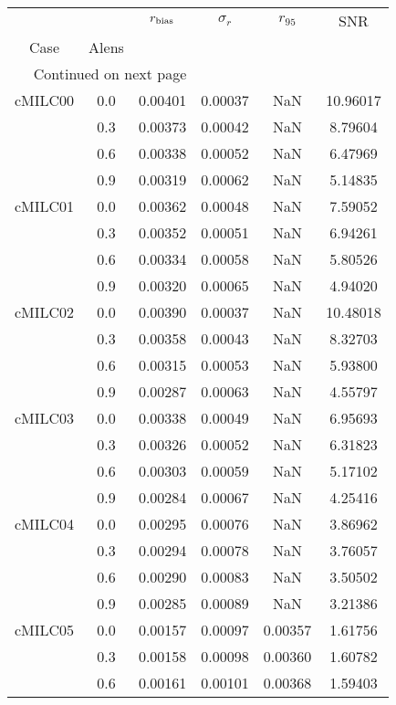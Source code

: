 \begin{longtable}{cccccc}
\toprule
        &     &  $r_{\rm bias}$  &  $\sigma_r$ &  $r_{95}$ &      SNR \\
Case & Alens &                  &             &           &          \\
\midrule
\endhead
\midrule
\multicolumn{3}{r}{{Continued on next page}} \\
\midrule
\endfoot

\bottomrule
\endlastfoot
cMILC00 & 0.0 & 0.00401 & 0.00037 & NaN & 10.96017 \\
        & 0.3 & 0.00373 & 0.00042 & NaN & 8.79604 \\
        & 0.6 & 0.00338 & 0.00052 & NaN & 6.47969 \\
        & 0.9 & 0.00319 & 0.00062 & NaN & 5.14835 \\
cMILC01 & 0.0 & 0.00362 & 0.00048 & NaN & 7.59052 \\
        & 0.3 & 0.00352 & 0.00051 & NaN & 6.94261 \\
        & 0.6 & 0.00334 & 0.00058 & NaN & 5.80526 \\
        & 0.9 & 0.00320 & 0.00065 & NaN & 4.94020 \\
cMILC02 & 0.0 & 0.00390 & 0.00037 & NaN & 10.48018 \\
        & 0.3 & 0.00358 & 0.00043 & NaN & 8.32703 \\
        & 0.6 & 0.00315 & 0.00053 & NaN & 5.93800 \\
        & 0.9 & 0.00287 & 0.00063 & NaN & 4.55797 \\
cMILC03 & 0.0 & 0.00338 & 0.00049 & NaN & 6.95693 \\
        & 0.3 & 0.00326 & 0.00052 & NaN & 6.31823 \\
        & 0.6 & 0.00303 & 0.00059 & NaN & 5.17102 \\
        & 0.9 & 0.00284 & 0.00067 & NaN & 4.25416 \\
cMILC04 & 0.0 & 0.00295 & 0.00076 & NaN & 3.86962 \\
        & 0.3 & 0.00294 & 0.00078 & NaN & 3.76057 \\
        & 0.6 & 0.00290 & 0.00083 & NaN & 3.50502 \\
        & 0.9 & 0.00285 & 0.00089 & NaN & 3.21386 \\
cMILC05 & 0.0 & 0.00157 & 0.00097 & 0.00357 & 1.61756 \\
        & 0.3 & 0.00158 & 0.00098 & 0.00360 & 1.60782 \\
        & 0.6 & 0.00161 & 0.00101 & 0.00368 & 1.59403 \\

\end{longtable}
